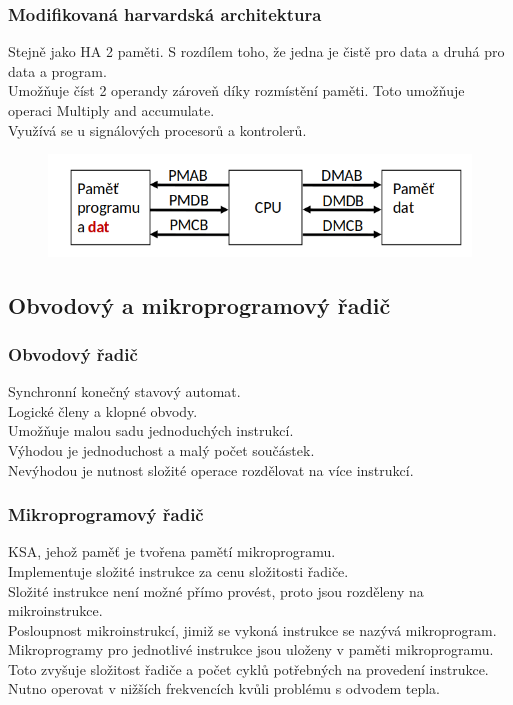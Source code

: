 \subsubsection*{Modifikovaná harvardská architektura}
Stejně jako HA 2 paměti. S rozdílem toho, že jedna je čistě pro data a druhá pro data a program.\\
Umožňuje číst 2 operandy zároveň díky rozmístění paměti. Toto umožňuje operaci Multiply and accumulate. \\
Využívá se u signálových procesorů a kontrolerů. \\

\begin{figure}[h!]
    \centering
    \includegraphics[width = \textwidth]{img/MHAporovnani.png}
\end{figure}

\subsection{Obvodový a mikroprogramový řadič}
\subsubsection*{Obvodový řadič}
Synchronní konečný stavový automat.\\
Logické členy a klopné obvody. \\
Umožňuje malou sadu jednoduchých instrukcí. \\
Výhodou je jednoduchost a malý počet součástek. \\
Nevýhodou je nutnost složité operace rozdělovat na více instrukcí. \\

\subsubsection*{Mikroprogramový řadič}
KSA, jehož paměť je tvořena pamětí mikroprogramu. \\
Implementuje složité instrukce za cenu složitosti řadiče. \\
Složité instrukce není možné přímo provést, proto jsou rozděleny na mikroinstrukce. \\
Posloupnost mikroinstrukcí, jimiž se vykoná instrukce se nazývá mikroprogram. \\
Mikroprogramy pro jednotlivé instrukce jsou uloženy v paměti mikroprogramu. \\
Toto zvyšuje složitost řadiče a počet cyklů potřebných na provedení instrukce. \\
Nutno operovat v nižších frekvencích kvůli problému s odvodem tepla. \\

